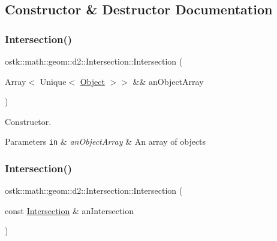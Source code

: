 \subsection{Constructor \& Destructor Documentation}
\mbox{\label{classostk_1_1math_1_1geom_1_1d2_1_1_intersection_a52e7ba577832b73a1eb5c95eaddf2834}} 
\subsubsection{\texorpdfstring{Intersection()}{Intersection()}\hspace{0.1cm}{\footnotesize\ttfamily [1/2]}}
{\footnotesize\ttfamily ostk\+::math\+::geom\+::d2\+::\+Intersection\+::\+Intersection (\begin{DoxyParamCaption}\item[{Array$<$ Unique$<$ \hyperlink{classostk_1_1math_1_1geom_1_1d2_1_1_object}{Object} $>$$>$ \&\&}]{an\+Object\+Array }\end{DoxyParamCaption})}



Constructor. 


\begin{DoxyParams}[1]{Parameters}
\mbox{\tt in}  & {\em an\+Object\+Array} & An array of objects \\
\hline
\end{DoxyParams}
\mbox{\label{classostk_1_1math_1_1geom_1_1d2_1_1_intersection_a8d8b22032a70a03974e51bf2f8d57cd7}} 
\subsubsection{\texorpdfstring{Intersection()}{Intersection()}\hspace{0.1cm}{\footnotesize\ttfamily [2/2]}}
{\footnotesize\ttfamily ostk\+::math\+::geom\+::d2\+::\+Intersection\+::\+Intersection (\begin{DoxyParamCaption}\item[{const \hyperlink{classostk_1_1math_1_1geom_1_1d2_1_1_intersection}{Intersection} \&}]{an\+Intersection }\end{DoxyParamCaption})}



